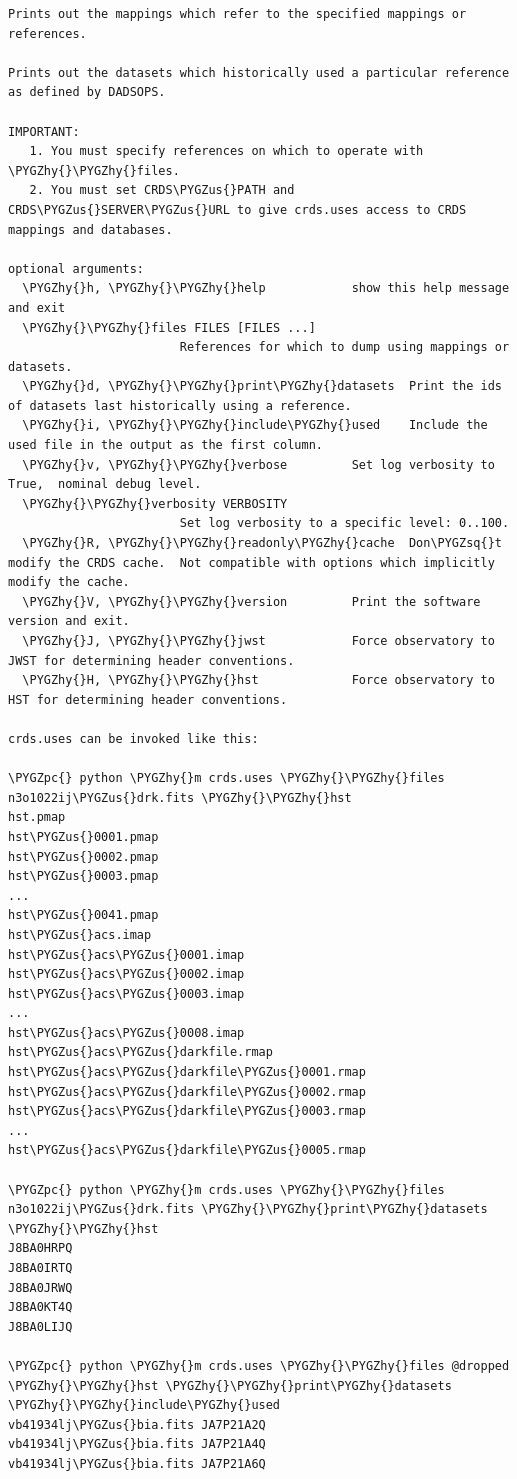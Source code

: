 \documentclass[letterpaper,10pt,english]{sphinxmanual}
\def\PYGZus{\char`\_}
\def\PYGZpc{\char`\%}
\def\PYGZhy{\char`\-}
\def\PYGZsq{\char`\'}
\begin{document}
\begin{Verbatim}[commandchars=\\\{\}]
Prints out the mappings which refer to the specified mappings or references.

Prints out the datasets which historically used a particular reference as defined by DADSOPS.

IMPORTANT:
   1. You must specify references on which to operate with \PYGZhy{}\PYGZhy{}files.
   2. You must set CRDS\PYGZus{}PATH and CRDS\PYGZus{}SERVER\PYGZus{}URL to give crds.uses access to CRDS mappings and databases.

optional arguments:
  \PYGZhy{}h, \PYGZhy{}\PYGZhy{}help            show this help message and exit
  \PYGZhy{}\PYGZhy{}files FILES [FILES ...]
                        References for which to dump using mappings or datasets.
  \PYGZhy{}d, \PYGZhy{}\PYGZhy{}print\PYGZhy{}datasets  Print the ids of datasets last historically using a reference.
  \PYGZhy{}i, \PYGZhy{}\PYGZhy{}include\PYGZhy{}used    Include the used file in the output as the first column.
  \PYGZhy{}v, \PYGZhy{}\PYGZhy{}verbose         Set log verbosity to True,  nominal debug level.
  \PYGZhy{}\PYGZhy{}verbosity VERBOSITY
                        Set log verbosity to a specific level: 0..100.
  \PYGZhy{}R, \PYGZhy{}\PYGZhy{}readonly\PYGZhy{}cache  Don\PYGZsq{}t modify the CRDS cache.  Not compatible with options which implicitly modify the cache.
  \PYGZhy{}V, \PYGZhy{}\PYGZhy{}version         Print the software version and exit.
  \PYGZhy{}J, \PYGZhy{}\PYGZhy{}jwst            Force observatory to JWST for determining header conventions.
  \PYGZhy{}H, \PYGZhy{}\PYGZhy{}hst             Force observatory to HST for determining header conventions.

crds.uses can be invoked like this:

\PYGZpc{} python \PYGZhy{}m crds.uses \PYGZhy{}\PYGZhy{}files n3o1022ij\PYGZus{}drk.fits \PYGZhy{}\PYGZhy{}hst
hst.pmap
hst\PYGZus{}0001.pmap
hst\PYGZus{}0002.pmap
hst\PYGZus{}0003.pmap
...
hst\PYGZus{}0041.pmap
hst\PYGZus{}acs.imap
hst\PYGZus{}acs\PYGZus{}0001.imap
hst\PYGZus{}acs\PYGZus{}0002.imap
hst\PYGZus{}acs\PYGZus{}0003.imap
...
hst\PYGZus{}acs\PYGZus{}0008.imap
hst\PYGZus{}acs\PYGZus{}darkfile.rmap
hst\PYGZus{}acs\PYGZus{}darkfile\PYGZus{}0001.rmap
hst\PYGZus{}acs\PYGZus{}darkfile\PYGZus{}0002.rmap
hst\PYGZus{}acs\PYGZus{}darkfile\PYGZus{}0003.rmap
...
hst\PYGZus{}acs\PYGZus{}darkfile\PYGZus{}0005.rmap

\PYGZpc{} python \PYGZhy{}m crds.uses \PYGZhy{}\PYGZhy{}files n3o1022ij\PYGZus{}drk.fits \PYGZhy{}\PYGZhy{}print\PYGZhy{}datasets \PYGZhy{}\PYGZhy{}hst
J8BA0HRPQ
J8BA0IRTQ
J8BA0JRWQ
J8BA0KT4Q
J8BA0LIJQ

\PYGZpc{} python \PYGZhy{}m crds.uses \PYGZhy{}\PYGZhy{}files @dropped \PYGZhy{}\PYGZhy{}hst \PYGZhy{}\PYGZhy{}print\PYGZhy{}datasets \PYGZhy{}\PYGZhy{}include\PYGZhy{}used
vb41934lj\PYGZus{}bia.fits JA7P21A2Q
vb41934lj\PYGZus{}bia.fits JA7P21A4Q
vb41934lj\PYGZus{}bia.fits JA7P21A6Q
\end{Verbatim}
\end{document}

